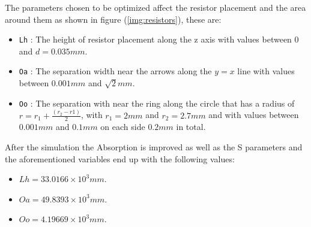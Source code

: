         The parameters chosen to be optimized affect the resistor placement and the area around 
        them as shown in figure (\ref{img:resistors}), these are:
        \begin{itemize}
            \item \texttt{Lh} : The height of resistor placement along the \textsf{z} axis
                with values between 0 and $d=0.035mm$.
            \item \texttt{Oa} : The separation width near the arrows along the $y=x$ line
                with values between $0.001mm$ and $\sqrt{2}mm$.
            \item \texttt{Oo} : The separation with near the ring along the circle that has a 
                radius of $r=r_1+\frac{(r_2-r1)}{2}$, with $r_1=2mm$ and $r_2=2.7mm$ and with 
                values between $0.001mm$ and $0.1mm$ on each side $0.2mm$ in total.
        \end{itemize}
        
        After the simulation the Absorption is improved as well as the S parameters and
        the aforementioned variables end up with the following values:
        \begin{itemize}
            \item $ Lh = 33.0166 \times 10^3 mm $.
            \item $ Oa = 49.8393 \times 10^3 mm $.
            \item $ Oo = 4.19669 \times 10^3 mm $.
        \end{itemize}


